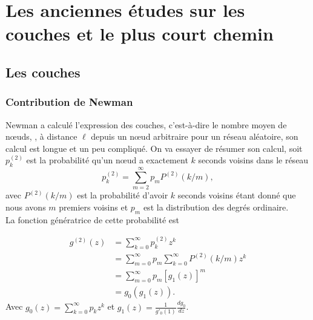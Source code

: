 \section{Les anciennes études sur les couches et le plus court chemin}
\subsection{Les couches}
\subsubsection{Contribution de Newman}
Newman \cite{Newman2010-456} a calculé l'expression des couches, c'est-à-dire le nombre moyen de nœuds, \nl, à distance $\ell$ depuis un nœud arbitraire pour un réseau aléatoire, son calcul est longue et un peu compliqué. On va essayer de résumer son calcul, soit $p_k^{(2)}$ est la probabilité qu'un nœud a exactement $k$ seconds voisins dans le réseau
\begin{equation}
p_k^{(2)}=\sum_{m=2}^{\infty}p_mP^{(2)}(k/m),
\end{equation}
avec $P^{(2)}(k/m)$ est la probabilité d'avoir $k$ seconds voisins étant donné que nous avons $m$ premiers voisins et $p_m$ est la distribution des degrés ordinaire.\\
La fonction génératrice de cette probabilité est 

\begin{align}
	g^{(2)}(z)&=\sum_{k=0}^{\infty}p_k^{(2)}z^{k}\nonumber\\
	&=\sum_{m=0}^{\infty}p_m\sum_{k=0}^{\infty}P^{(2)}(k/m)z^k\nonumber\\
	&=\sum_{m=0}^{\infty}p_m[g_1(z)]^m\nonumber\\
	&=g_0(g_1(z)).
	\label{p-generatrice-2}
\end{align}
Avec $g_0(z)=\sum_{k=0}^{\infty}p_kz^k$ et $g_1(z)=\frac{1}{g'_0(1)}\frac{dg_0}{dz}$.\\

